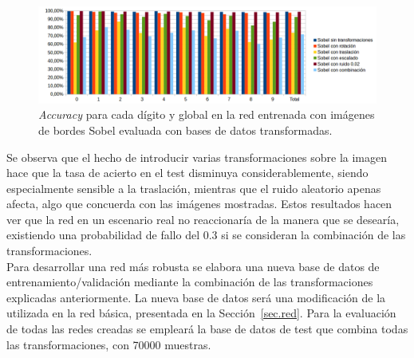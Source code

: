 \begin{figure}[H]
	\begin{center}
		\includegraphics[width=1\textwidth]{figures/sobelev}
		\caption{\textit{Accuracy} para cada dígito y global en la red entrenada con imágenes de bordes Sobel evaluada con bases de datos transformadas.}
		\label{fig.sobelEval}
	\end{center}
\end{figure}

Se observa que el hecho de introducir varias transformaciones sobre la imagen hace que la tasa de acierto en el test disminuya considerablemente, siendo especialmente sensible a la traslación, mientras que el ruido aleatorio apenas afecta, algo que concuerda con las imágenes mostradas. Estos resultados hacen ver que la red en un escenario real no reaccionaría de la manera que se desearía, existiendo una probabilidad de fallo del 0.3 si se consideran la combinación de las transformaciones.\\

Para desarrollar una red más robusta se elabora una nueva base de datos de entrenamiento/validación mediante la combinación de las transformaciones explicadas anteriormente. La nueva base de datos será una modificación de la utilizada en la red básica, presentada en la Sección~\ref{sec.red}. Para la evaluación de todas las redes creadas se empleará la base de datos de test que combina todas las transformaciones, con 70000 muestras.\\

